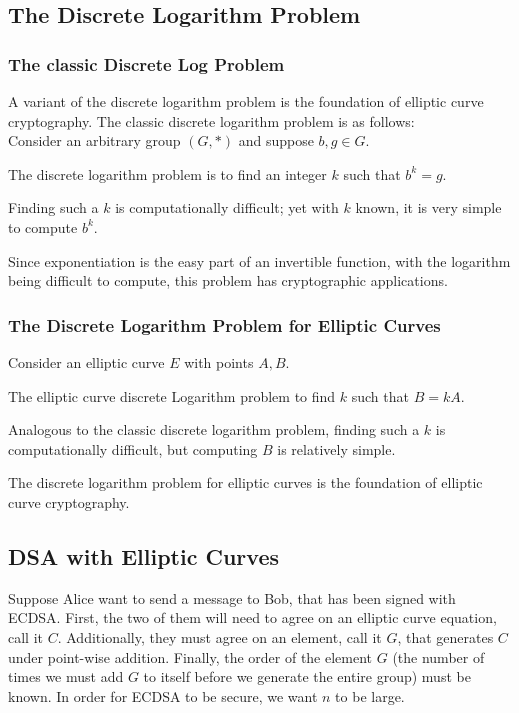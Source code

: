 \subsection{The Discrete Logarithm Problem}

\subsubsection{The classic Discrete Log Problem}
A variant of the discrete logarithm problem is the foundation of elliptic
curve cryptography.  The classic discrete logarithm problem is as follows:\\

Consider an arbitrary group $(G, *)$ and suppose $b,g \in G$.

The discrete logarithm problem is to find an integer $k$
such that $b^k = g$.

Finding such a $k$ is computationally difficult; yet
with $k$ known, it is very simple to compute $b^k$.

Since exponentiation is the easy part of an invertible function, with
the logarithm being difficult to compute, this problem has cryptographic
applications.


\subsubsection{The Discrete Logarithm Problem for Elliptic Curves}

Consider an elliptic curve $E$ with points $A,B$.

The elliptic curve discrete Logarithm problem to find $k$
such that $B = kA$.

Analogous to the classic discrete logarithm problem, finding such a $k$
is computationally difficult, but computing $B$ is relatively simple.

The discrete logarithm problem for elliptic curves is the foundation of
elliptic curve cryptography.

\subsection{DSA with Elliptic Curves}

Suppose Alice want to send a message to Bob, that has been signed with ECDSA.
First, the two of them will need to agree on an elliptic curve equation, call it $C$.
Additionally, they must agree on an element, call it $G$, that generates $C$ under
point-wise addition.  Finally, the order of the element $G$ (the number of times we must add
$G$ to itself before we generate the entire group) must be known. In order for ECDSA to be
secure, we want $n$ to be large.


